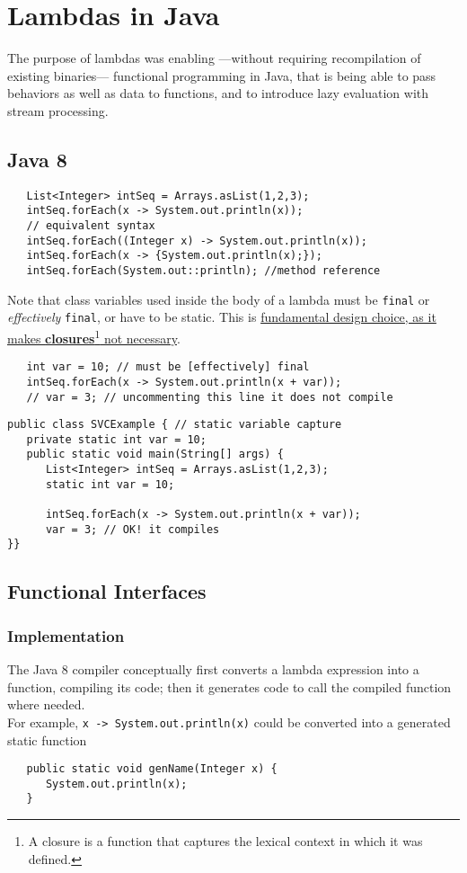 \chapter{Lambdas in Java}
The purpose of lambdas was enabling ---without requiring recompilation of existing binaries--- functional programming in Java, that is being able to pass behaviors as well as data to functions, and to introduce lazy evaluation with stream processing.
\section{Java 8}
\lstset{style=javaBlockAnn}
\begin{lstlisting}
   List<Integer> intSeq = Arrays.asList(1,2,3);
   intSeq.forEach(x -> System.out.println(x));
   // equivalent syntax
   intSeq.forEach((Integer x) -> System.out.println(x));
   intSeq.forEach(x -> {System.out.println(x);});
   intSeq.forEach(System.out::println); //method reference
\end{lstlisting}

Note that class variables used inside the body of a lambda must be \lstinline|final| or \textit{effectively} \lstinline|final|, or have to be static.
This is \ul{fundamental design choice, as it makes \textbf{closures}\footnote{A closure is a function that captures the lexical context in which it was defined.} not necessary}.
\begin{lstlisting}
   int var = 10; // must be [effectively] final
   intSeq.forEach(x -> System.out.println(x + var));
   // var = 3; // uncommenting this line it does not compile
\end{lstlisting}
\begin{lstlisting}
public class SVCExample { // static variable capture
   private static int var = 10;
   public static void main(String[] args) {
      List<Integer> intSeq = Arrays.asList(1,2,3);
      static int var = 10;
   
      intSeq.forEach(x -> System.out.println(x + var));
      var = 3; // OK! it compiles
}}
   \end{lstlisting}

\section{Functional Interfaces}
\subsection{Implementation}
The Java 8 compiler conceptually first converts a lambda
expression into a function, compiling its code; 
then it generates code to call the compiled function where
needed.\\
For example, \lstinline|x -> System.out.println(x)| could be
converted into a generated static function
\begin{lstlisting}
   public static void genName(Integer x) {
      System.out.println(x);
   }
\end{lstlisting}


